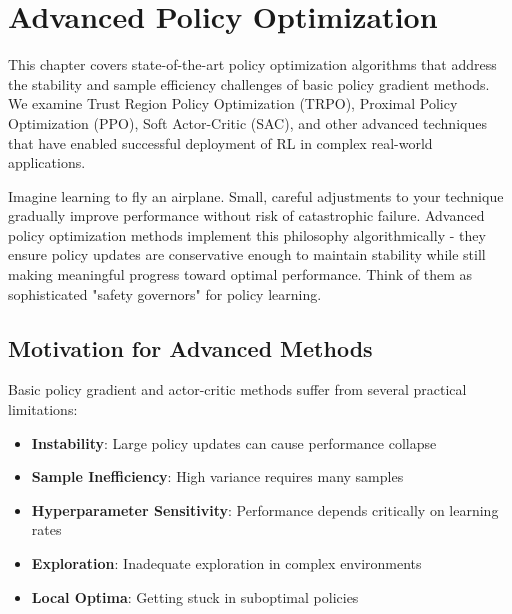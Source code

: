 \chapter{Advanced Policy Optimization}
\label{ch:advanced-policy-optimization}

\begin{keyideabox}
This chapter covers state-of-the-art policy optimization algorithms that address the stability and sample efficiency challenges of basic policy gradient methods. We examine Trust Region Policy Optimization (TRPO), Proximal Policy Optimization (PPO), Soft Actor-Critic (SAC), and other advanced techniques that have enabled successful deployment of RL in complex real-world applications.
\end{keyideabox}

\begin{intuitionbox}
Imagine learning to fly an airplane. Small, careful adjustments to your technique gradually improve performance without risk of catastrophic failure. Advanced policy optimization methods implement this philosophy algorithmically - they ensure policy updates are conservative enough to maintain stability while still making meaningful progress toward optimal performance. Think of them as sophisticated "safety governors" for policy learning.
\end{intuitionbox}

\section{Motivation for Advanced Methods}

Basic policy gradient and actor-critic methods suffer from several practical limitations:

\begin{itemize}
    \item \textbf{Instability}: Large policy updates can cause performance collapse
    \item \textbf{Sample Inefficiency}: High variance requires many samples
    \item \textbf{Hyperparameter Sensitivity}: Performance depends critically on learning rates
    \item \textbf{Exploration}: Inadequate exploration in complex environments
    \item \textbf{Local Optima}: Getting stuck in suboptimal policies
\end{itemize}

